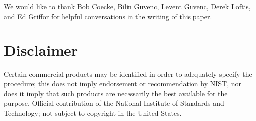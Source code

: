 \documentclass[sigconf]{acmart}
\begin{document}
\begin{acks}
We would like to thank Bob Coecke, Bilin Guvenc, Levent Guvenc, Derek Loftis, and Ed Griffor for helpful conversations in the writing of this paper.
\end{acks}

\section*{Disclaimer}
Certain commercial products may be identified in order to adequately specify the procedure; this does not imply endorsement or recommendation by NIST, nor does it imply that such products are necessarily the best available for the purpose. Official contribution of the National Institute of Standards and Technology; not subject to copyright in the United States.

\balance %
%

 
\end{document}
